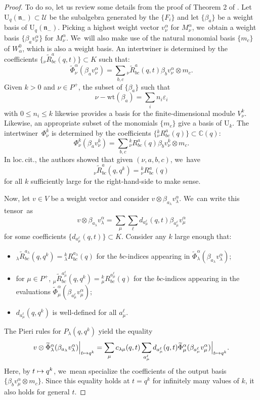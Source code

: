 \documentclass[11pt]{article}
\let\epsilon\varepsilon
\newcommand\mto{\mathchoice{\longmapsto}{\mapsto}{\mapsto}{\mapsto}}
\newcommand{\rU}{\mathrm{U}}
\theoremstyle{definition}
\newcommand{\CC}{\mathbb{C}}
\newcommand{\UU}{\mathcal{U}}
\begin{document}
\begin{proof}
To do so, let us review some details from the proof of Theorem 2 of \cite{EtKirQuant}.
Let $\rU_q(\mathfrak{n}_-)\subset\UU$ be the subalgebra generated by the $\{F_i\}$ and let $\{\beta_a\}$ be a weight basis of $\rU_q(\mathfrak{n}_-)$.
Picking a highest weight vector $v_\nu^\alpha$ for $M_\nu^\alpha$, we~obtain a weight basis $\{\beta_a v_\nu^\alpha\}$ for $M_\nu^\alpha$. We~will also make use of the natural monomial basis $\{m_c\}$ of $W_\alpha^0$, which is also a weight basis.
An intertwiner is determined by the coefficients $\{ {}_\nu\widetilde{R}_{bc}^a(q,t)\}\subset K$ such that:
\[
\widetilde{\Phi}_\nu^\alpha(\beta_a v_\nu^\alpha)=\sum_{b,c}{}_\nu\widetilde{R}_{bc}^a(q,t)\beta_b v_\nu^\alpha\otimes m_c.
\]
Given $k>0$ and $\nu\in P^+$, the subset of $\{\beta_a\}$ such that
\[
\nu-\mathrm{wt}(\beta_a)=\sum_{i}n_i\epsilon_i
\]
with $0\le n_i\le k$ likewise provides a basis for the finite-dimensional module $V_\nu^k$.
Likewise, an appropriate subset of the monomials $\{m_c\}$ give a basis of $\rU_k$.
The intertwiner~$\Phi_\nu^k$ is determined by the coefficients $\{ {}_\nu^kR_{bc}^a(q)\}\subset\CC(q)$:
\[
\Phi_\nu^k(\beta_a v_\nu^k)=\sum_{b,c}{}_\nu^k R_{bc}^a(q)\beta_b v_\nu^k\otimes m_c.
\]
In loc.\,cit., the authors showed that given $(\nu, a, b, c)$, we~have
\[
{}_\nu\widetilde{R}_{bc}^a(q,q^k)= {}_\nu^kR_{bc}^a(q)
\]
for all $k$ sufficiently large for the right-hand-side to make sense.

Now, let $v\in V$ be a weight vector and consider $v\otimes\beta_{a_\lambda}v_\lambda^\alpha$. We~can write this tensor~as
\[
v\otimes\beta_{a_\lambda}v_\lambda^\alpha = \sum_{\mu}\sum_{\ell}d_{a_\mu^\ell}(q,t)\beta_{a_\mu^\ell}v_\mu^\alpha
\]
for some coefficients $\{d_{a_\mu^\ell}(q,t)\}\subset K$.
Consider any $k$ large enough that:
\begin{itemize}
\item ${}_\lambda\widetilde{R}_{bc}^{a_\lambda}(q,q^k)= {}_\lambda^kR_{bc}^{a_\lambda}(q)$ for the $bc$-indices appearing in $\widetilde{\Phi}_\lambda^\alpha(\beta_{a_\lambda}v_\lambda^\alpha)$;
\item for $\mu\in P^+$, ${}_\mu\widetilde{R}_{bc}^{a_\mu^\ell}(q,q^k)= {}_\mu^k R_{bc}^{a_\mu^\ell}(q)$ for the $bc$-indices appearing in the evaluations $\widetilde{\Phi}_\mu^\alpha(\beta_{a_\mu^\ell}v_\mu^\alpha)$;
\item $d_{a_\mu^\ell}(q,q^k)$ is well-defined for all $a_\mu^\ell$.
\end{itemize}
The Pieri rules for $P_\lambda(q,q^k)$ yield the equality
\[
v\otimes\widetilde{\Phi}_\lambda^\alpha(\beta_{a_\lambda}v_\lambda^\alpha)\Big|_{t\mto q^k}
=
\sum_{\mu} c_{\lambda\mu}(q,t)\sum_{a_\mu^\ell}d_{a_\mu^\ell}(q,t)\widetilde{\Phi}_\mu^\alpha(\beta_{a_\mu^\ell}v_\mu^\alpha)\Big|_{t\mto q^k}.
\]
Here, by $t\mto q^k$, we~mean specialize the coefficients of the output basis $\{\beta_b v_\mu^\alpha\otimes m_c\}$.
Since this equality holds at $t=q^k$ for infinitely many values of $k$, it also holds for general $t$.
\end{proof}
\end{document}
